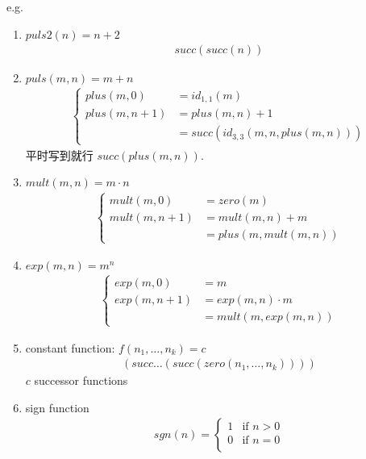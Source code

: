e.g. 
\begin{enumerate}
    \item $puls2(n)=n+2$
    \begin{align*}
        succ(succ(n))
    \end{align*}
    \item $puls(m,n)=m+n$
    \begin{align*}
        \left\{ \begin{array}{rl}
            plus(m,0)&=id_{1,1}(m)\\
            plus(m,n+1)&=plus(m,n)+1\\
            &=succ(id_{3,3}(m,n,plus(m,n)))
        \end{array} \right.
    \end{align*}
    平时写到就行 $succ(plus(m,n))$.
    \item $mult(m,n)=m\cdot n$
    \begin{align*}
        \left\{ \begin{array}{rl}
            mult(m,0)&=zero(m)\\
            mult(m,n+1)&=mult(m,n)+m\\
            &=plus(m,mult(m,n))
        \end{array} \right.
    \end{align*}
    \item $exp(m,n)=m^n$
    \begin{align*}
        \left\{ \begin{array}{rl}
            exp(m,0)&=m\\
            exp(m,n+1)&=exp(m,n)\cdot m\\
            &=mult(m,exp(m,n))
        \end{array} \right.
    \end{align*}
    \item constant function: $f(n_1,\dots,n_k)=c$
    \begin{align*}
        (succ\dots(succ(zero(n_1,\dots,n_k))))
    \end{align*}
    $c$ successor functions
    \item sign function
    \begin{align*}
        sgn(n)=\left\{ \begin{array}{ll}
            1 & \text{if }n>0\\
            0 & \text{if }n=0\\
        \end{array} \right.
    \end{align*}
    \begin{align*}

\end{align*}
\end{enumerate}

